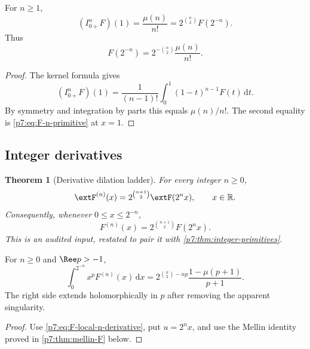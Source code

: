 \documentclass[11pt,oneside]{article}
\newtheorem{theorem}{Theorem}[section]
\theoremstyle{definition}
\theoremstyle{remark}
\newcommand{\R}{\mathbb R}
\newcommand{\dd}{\,\mathrm d}
\newcommand{\1}{\mathbf 1}
\begin{document}
\begin{corollary}
\label{p7:cor:primitive-endpoints}
For $n\ge1$,
\begin{equation}
 (I_{0+}^{n}F)(1)=\frac{\mu(n)}{n!}
 =2^{\binom n2}F(2^{-n}).
 \label{p7:eq:primitive-endpoint-moment}
\end{equation}
Thus
\begin{equation}
 F(2^{-n})=2^{-\binom n2}\frac{\mu(n)}{n!}.
 \label{p7:eq:dyadic-moment-basic}
\end{equation}
\end{corollary}

\begin{proof}
The kernel formula gives
\[
 (I_{0+}^{n}F)(1)=\frac1{(n-1)!}\int_0^1(1-t)^{n-1}F(t)\dd t.
\]
By symmetry and integration by parts this equals $\mu(n)/n!$.  The second equality is
\cref{p7:eq:F-n-primitive} at $x=1$.
\end{proof}

\subsection{Integer derivatives}

\begin{theorem}[Derivative dilation ladder]
\label{p7:thm:integer-derivatives}
For every integer $n\ge0$,
\begin{equation}
 \extF^{(n)}(x)=2^{\binom{n+1}{2}}\extF(2^nx),
 \qquad x\in\R.
 \label{p7:eq:global-n-derivative}
\end{equation}
Consequently, whenever $0\le x\le2^{-n}$,
\begin{equation}
 F^{(n)}(x)=2^{\binom{n+1}{2}}F(2^nx).
 \label{p7:eq:F-local-n-derivative}
\end{equation}
This is an audited input, restated to pair it with \cref{p7:thm:integer-primitives}.
\end{theorem}

\begin{corollary}
\label{p7:cor:local-derivative-moments}
For $n\ge0$ and $\Ree p>-1$,
\begin{equation}
 \int_0^{2^{-n}}x^pF^{(n)}(x)\dd x
 =2^{\binom n2-np}\frac{1-\mu(p+1)}{p+1}.
 \label{p7:eq:local-derivative-moment}
\end{equation}
The right side extends holomorphically in $p$ after removing the apparent singularity.
\end{corollary}

\begin{proof}
Use \cref{p7:eq:F-local-n-derivative}, put $u=2^nx$, and use the Mellin identity proved in
\cref{p7:thm:mellin-F} below.
\end{proof}
\end{document}
